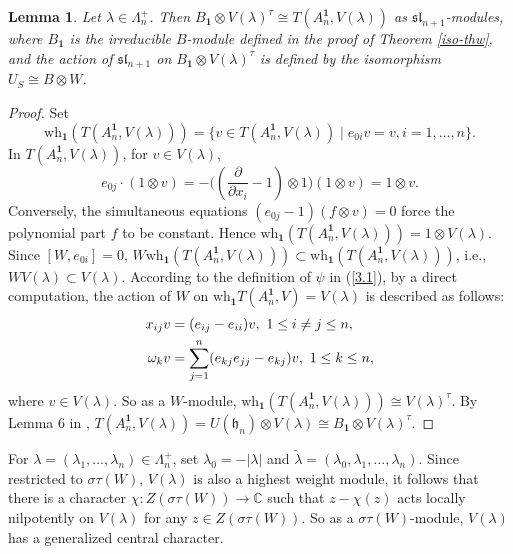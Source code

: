 \documentclass[12pt,a4paper]{amsart}
\newtheorem{lemma}[theorem]{Lemma}%
\numberwithin{equation}{section}
\newcommand{\C}{\mathbb C}
\def\mh{\mathfrak{h}}
\def\sl{\mathfrak{sl}}
\def\b1{\mathbf{1}}
\def\l{\lambda}
\begin{document}
\begin{lemma}Let $\l\in \Lambda_n^+$. Then $B_{\b1}\otimes V(\l)^\tau\cong T(A_n^{\b1}, V(\l))$ as $\sl_{n+1}$-modules, where $B_{\b1}$ is the irreducible $B$-module defined in the proof of Theorem \ref{iso-thw}, and the action of $\sl_{n+1}$ on $B_{\b1}\otimes V(\l)^\tau$ is defined by the isomorphism $U_S\cong B\otimes W$.
\end{lemma}
\begin{proof}Set
$$\mathrm{wh}_\b1(T(A_n^{\b1}, V(\l)))=\{v\in T(A_n^{\b1}, V(\l))\mid e_{0i}v=v,i=1,\dots,n\}.$$ In $T(A_n^{\b1}, V(\l))$, for $v\in V(\lambda)$,
$$e_{0j}\cdot (1\otimes v)=-\big((\frac{\partial}{\partial x_i}-1)\otimes 1\big)(1\otimes v)=1\otimes v.$$
Conversely, the simultaneous equations $(e_{0j}-1)(f\otimes v)=0$ force the
polynomial part $f$ to be constant. Hence
$\mathrm{wh}_{\b1}(T(A_n^{\b1},V(\l)))=1\otimes V(\l)$. Since $[W,e_{0i}]=0$,  $W\mathrm{wh}_\b1(T(A_n^{\b1}, V(\l)))\subset \text{wh}_\b1(T(A_n^{\b1}, V(\l)))$, i.e., $W V(\l)\subset V(\l)$.
According to the definition of $\psi$ in (\ref{3.1}), by a direct computation, the action of $W$ on $\text{wh}_{\b1}T(A_n^\b1,V)=V(\l)$ is described as follows:
\begin{equation}\label{x-w-act2}\aligned x_{ij}v &=  (e_{ij}-e_{ii})v,\ 1\leq i\neq j\leq n,\\
 \omega_k v
&=\sum_{j=1}^n (e_{kj}e_{jj}-e_{kj})v,\ 1\leq k\leq n,
\endaligned \end{equation}where $ v\in V(\l)$. So
as a $W$-module, $\mathrm{wh}_\b1(T(A_n^{\b1}, V(\l)))\cong V(\l)^\tau$.
 By Lemma 6 in \cite{LL}, $T(A_n^{\b1}, V(\l))=U(\mh_n)\otimes V(\l)\cong B_{\b1}\otimes V(\l)^\tau$.
\end{proof}

For $\l=(\l_1,\dots,\l_n)\in \Lambda_n^+$, set $\l_0=-|\l|$ and $\widetilde{\l}=(\l_0,\l_1,\dots,\l_n)$. Since restricted to $\sigma\tau(W)$, $V(\l)$ is also a highest weight module,  it follows that there is a character $\chi: Z(\sigma\tau(W))\rightarrow \C$ such that $z-\chi(z)$ acts locally nilpotently on $V(\l)$ for any $z\in Z(\sigma\tau(W))$. So as a $\sigma\tau(W)$-module, $V(\l)$ has a generalized
central character.
\end{document}
